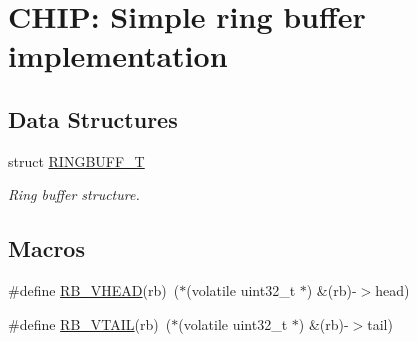 \hypertarget{group__Ring__Buffer}{\section{C\-H\-I\-P\-: Simple ring buffer implementation}
\label{group__Ring__Buffer}
}
\subsection*{Data Structures}
\begin{DoxyCompactItemize}
\item 
struct \hyperlink{structRINGBUFF__T}{R\-I\-N\-G\-B\-U\-F\-F\-\_\-\-T}
\begin{DoxyCompactList}\small\item\em Ring buffer structure. \end{DoxyCompactList}\end{DoxyCompactItemize}
\subsection*{Macros}
\begin{DoxyCompactItemize}
\item 
\#define \hyperlink{group__Ring__Buffer_gab0e914e769172c3291a9cc36962bc4de}{R\-B\-\_\-\-V\-H\-E\-A\-D}(rb)~($\ast$(volatile uint32\-\_\-t $\ast$) \&(rb)-\/$>$head)
\item 
\#define \hyperlink{group__Ring__Buffer_ga9f7c4d3e3029e8318582a147a5c37674}{R\-B\-\_\-\-V\-T\-A\-I\-L}(rb)~($\ast$(volatile uint32\-\_\-t $\ast$) \&(rb)-\/$>$tail)
\end{DoxyCompactItemize}
